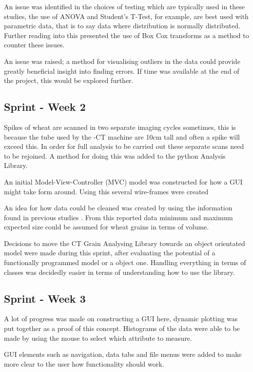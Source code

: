 \documentclass[11pt]{report}
\begin{document}
An issue was identified in the choices of testing which are typically used in these studies, the use of ANOVA and Student's T-Test, for example, are best used with parametric data, that is to say data where distribution is normally distributed. Further reading into this presented the use of Box Cox transforms as a method to counter these issues.

An issue was raised; a method for visualising outliers in the data could provide greatly beneficial insight into finding errors. If time was available at the end of the project, this would be explored further.

\subsection{Sprint - Week 2}
\label{sec:orged8acc0}

Spikes of wheat are scanned in two separate imaging cycles sometimes, this is because the tube used by the \textmu{}-CT machine are 10cm tall and often a spike will exceed this. In order for full analysis to be carried out these separate scans need to be rejoined. A method for doing this was added to the python Analysis Library.

An initial Model-View-Controller (MVC) model was constructed for how a GUI might take form around. Using this several wire-frames were created

An idea for how data could be cleaned was created by using the information found in previous studies \cite{Hughes2017}. From this reported data minimum and maximum expected size could be assumed for wheat grains in terms of volume.

Decisions to move the CT Grain Analysing Library towards an object orientated model were made during this sprint, after evaluating the potential of a functionally programmed model or a object one. Handling everything in terms of classes was decidedly easier in terms of understanding how to use the library.

\subsection{Sprint - Week 3}
\label{sec:orgefd43a8}

A lot of progress was made on constructing a GUI here, dynamic plotting was put together as a proof of this concept. Histograms of the data were able to be made by using the mouse to select which attribute to measure.

GUI elements such as navigation, data tabs and file menus were added to make more clear to the user how functionality should work.
\end{document}

